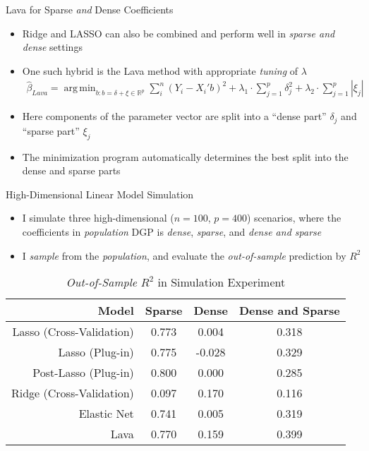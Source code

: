 \documentclass[aspectratio=1610,12pt,xcolor=dvipsnames]{beamer}
\DeclareMathOperator*{\argmin}{arg\,min}
\begin{document}
\begin{frame}{Lava for Sparse \textit{and} Dense Coefficients}

\begin{itemize}
    \item Ridge and LASSO can also be combined and perform well in \textit{sparse and dense} settings
    \item One such hybrid is the Lava method with appropriate \textit{tuning} of $\lambda$
    \begin{align*}
        \hat \beta_{Lava} = \argmin_{b:b=\delta+\xi\in\mathbb{R}^{p}}\sum_i^n(Y_i - X_i'b)^2 + \lambda_1 \cdot \sum_{j=1}^{p}\delta_j^2 + \lambda_2 \cdot \sum_{j=1}^{p}|\xi_j| 
    \end{align*}
    \item Here components of the parameter vector are split into a ``dense part'' $\delta_j$ and ``sparse part'' $\xi_j$
    \item The minimization program automatically determines the best split into the dense and sparse parts
\end{itemize}
\end{frame}

\begin{frame}{High-Dimensional Linear Model Simulation}

\begin{itemize}
    \item I simulate three high-dimensional ($n=100$, $p=400$) scenarios, where the coefficients in \textit{population} DGP is \textit{dense}, \textit{sparse}, and \textit{dense and sparse}
    \item I \textit{sample} from the \textit{population}, and evaluate the \textit{out-of-sample} prediction by $R^2$
\end{itemize}\vspace{-10pt}
\captionsetup{font=small}
\begin{table}[ht]
\small
\caption{\textit{Out-of-Sample} $R^2$ in Simulation Experiment}
\centering
\begin{tabular}{rccc}
  \hline
 Model & Sparse & Dense & Dense and Sparse \\ 
  \hline
  Lasso (Cross-Validation) & 0.773 & 0.004 & 0.318 \\ 
  Lasso (Plug-in) & 0.775 & -0.028 & 0.329 \\ 
  Post-Lasso (Plug-in) & 0.800 & 0.000 & 0.285 \\ 
  Ridge (Cross-Validation) & 0.097 & 0.170 & 0.116 \\ 
  Elastic Net & 0.741 & 0.005 & 0.319 \\ 
  Lava & 0.770 & 0.159 & 0.399 \\ 
   \hline
\end{tabular}
\end{table}
\end{frame}
\end{document}
